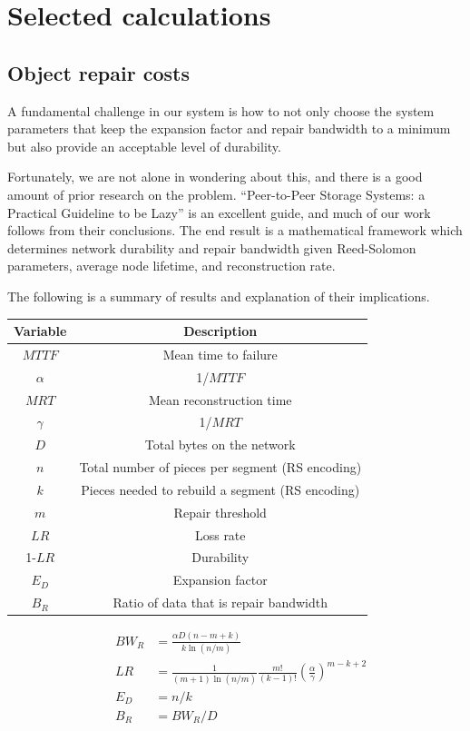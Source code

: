 \documentclass[8pt,fleqn,openany]{book}
\begin{document}
\chapter{Selected calculations}\label{chap:selected-calcs}

\section{Object repair costs}

A fundamental challenge in our system is how to not only choose the system
parameters that keep the expansion factor and repair bandwidth to a minimum but
also provide an acceptable level of durability.

Fortunately, we are not alone in wondering about this, and there is a good
amount of prior research on the problem.
``Peer-to-Peer Storage Systems: a Practical Guideline to be Lazy'' \cite{p2p-lazy} is an excellent guide, and much of our work follows from their conclusions.
The end result is a mathematical framework which determines network durability
and repair bandwidth given Reed-Solomon parameters, average node lifetime, and
reconstruction rate.

The following is a summary of results and explanation of their implications.

\begin{center}
\begin{tabular}{| c | c |}\hline
Variable & Description\\\hline
$MTTF$ & Mean time to failure \\
$\alpha$ & 1/$MTTF$\\
$MRT$ & Mean reconstruction time \\
$\gamma$ & 1/$MRT$\\
$D$&Total bytes on the network\\
$n$ & Total number of pieces per segment (RS encoding)\\
$k$ & Pieces needed to rebuild a segment (RS encoding)\\
$m$ & Repair threshold\\
$LR$ & Loss rate\\
1-$LR$ & Durability\\
$E_D$ & Expansion factor\\
$B_R$ & Ratio of data that is repair bandwidth\\
\hline
\end{tabular}
\end{center}

\begin{align*}
&&BW_R&=\frac{\alpha D(n-m+k)}{k\ln(n/m)}&\\
&&LR&=\frac{1}{(m+1)\ln(n/m)}\frac{m!}{(k-1)!}\left(\frac{\alpha}{\gamma}\right)^{m-k+2}&\\
&&E_D&=n/k&\\
&&B_R&=BW_R/D&\\
\end{align*}
\end{document}
